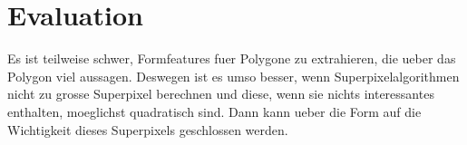 \chapter{Evaluation}
\label{evaluation}







Es ist teilweise schwer, Formfeatures fuer Polygone zu extrahieren, die ueber das Polygon viel aussagen. Deswegen ist es umso besser, wenn Superpixelalgorithmen nicht zu grosse Superpixel berechnen und diese, wenn sie nichts interessantes enthalten, moeglichst quadratisch sind. Dann kann ueber die Form auf die Wichtigkeit dieses Superpixels geschlossen werden.
